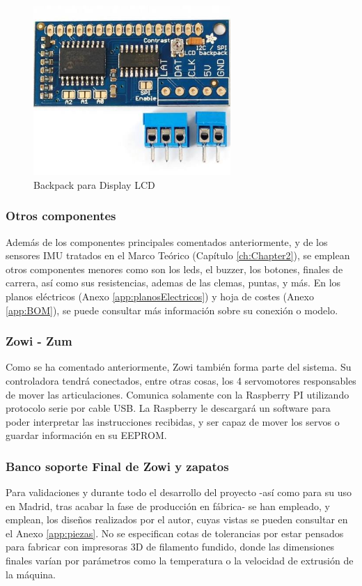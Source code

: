 \begin{figure}
\centering
\includegraphics[width=75mm]{Figures/backpack}
\caption{Backpack para Display LCD}
\label{fig:backpack}
\end{figure}

\subsubsection{Otros componentes}

Además de los componentes principales comentados anteriormente, y de los sensores IMU tratados en el Marco Teórico (Capítulo \ref{ch:Chapter2}), se emplean otros componentes menores como son los leds, el buzzer, los botones, finales de carrera, así como sus resistencias, ademas de las clemas, puntas, y más. En los planos eléctricos (Anexo \ref{app:planosElectricos}) y hoja de costes (Anexo \ref{app:BOM}), se puede consultar más información sobre su conexión o modelo.

\subsubsection{Zowi - Zum}

Como se ha comentado anteriormente, Zowi también forma parte del sistema. Su controladora tendrá conectados, entre otras cosas, los 4 servomotores responsables de mover las articulaciones. Comunica solamente con la Raspberry PI utilizando protocolo serie por cable USB. La Raspberry le descargará un software para poder interpretar las instrucciones recibidas, y ser capaz de mover los servos o guardar información en su EEPROM.

\subsubsection{Banco soporte Final de Zowi y zapatos}

Para validaciones y durante todo el desarrollo del proyecto -así como para su uso en Madrid, tras acabar la fase de producción en fábrica- se han empleado, y emplean, los diseños realizados por el autor, cuyas vistas se pueden consultar en el Anexo \ref{app:piezas}. No se especifican cotas de tolerancias por estar pensados para fabricar con impresoras 3D de filamento fundido, donde las dimensiones finales varían por parámetros como la temperatura o la velocidad de extrusión de la máquina.

